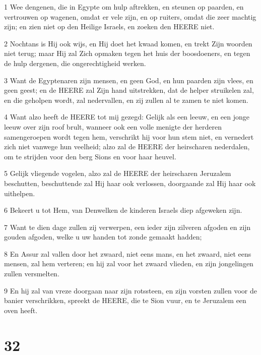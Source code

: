 \par 1 Wee dengenen, die in Egypte om hulp aftrekken, en steunen op paarden, en vertrouwen op wagenen, omdat er vele zijn, en op ruiters, omdat die zeer machtig zijn; en zien niet op den Heilige Israels, en zoeken den HEERE niet.
\par 2 Nochtans is Hij ook wijs, en Hij doet het kwaad komen, en trekt Zijn woorden niet terug; maar Hij zal Zich opmaken tegen het huis der boosdoeners, en tegen de hulp dergenen, die ongerechtigheid werken.
\par 3 Want de Egyptenaren zijn mensen, en geen God, en hun paarden zijn vlees, en geen geest; en de HEERE zal Zijn hand uitstrekken, dat de helper struikelen zal, en die geholpen wordt, zal nedervallen, en zij zullen al te zamen te niet komen.
\par 4 Want alzo heeft de HEERE tot mij gezegd: Gelijk als een leeuw, en een jonge leeuw over zijn roof brult, wanneer ook een volle menigte der herderen samengeroepen wordt tegen hem, verschrikt hij voor hun stem niet, en vernedert zich niet vanwege hun veelheid; alzo zal de HEERE der heirscharen nederdalen, om te strijden voor den berg Sions en voor haar heuvel.
\par 5 Gelijk vliegende vogelen, alzo zal de HEERE der heirscharen Jeruzalem beschutten, beschuttende zal Hij haar ook verlossen, doorgaande zal Hij haar ook uithelpen.
\par 6 Bekeert u tot Hem, van Denwelken de kinderen Israels diep afgeweken zijn.
\par 7 Want te dien dage zullen zij verwerpen, een ieder zijn zilveren afgoden en zijn gouden afgoden, welke u uw handen tot zonde gemaakt hadden;
\par 8 En Assur zal vallen door het zwaard, niet eens mans, en het zwaard, niet eens mensen, zal hem verteren; en hij zal voor het zwaard vlieden, en zijn jongelingen zullen versmelten.
\par 9 En hij zal van vreze doorgaan naar zijn rotssteen, en zijn vorsten zullen voor de banier verschrikken, spreekt de HEERE, die te Sion vuur, en te Jeruzalem een oven heeft.

\chapter{32}

